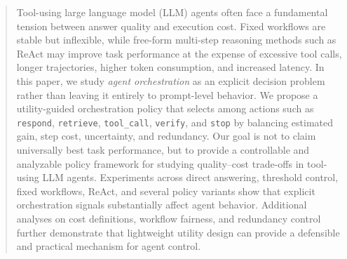 \begin{abstract}
Tool-using large language model (LLM) agents often face a fundamental tension between answer quality and execution cost. Fixed workflows are stable but inflexible, while free-form multi-step reasoning methods such as ReAct may improve task performance at the expense of excessive tool calls, longer trajectories, higher token consumption, and increased latency. In this paper, we study \emph{agent orchestration} as an explicit decision problem rather than leaving it entirely to prompt-level behavior. We propose a utility-guided orchestration policy that selects among actions such as \texttt{respond}, \texttt{retrieve}, \texttt{tool\_call}, \texttt{verify}, and \texttt{stop} by balancing estimated gain, step cost, uncertainty, and redundancy. Our goal is not to claim universally best task performance, but to provide a controllable and analyzable policy framework for studying quality--cost trade-offs in tool-using LLM agents. Experiments across direct answering, threshold control, fixed workflows, ReAct, and several policy variants show that explicit orchestration signals substantially affect agent behavior. Additional analyses on cost definitions, workflow fairness, and redundancy control further demonstrate that lightweight utility design can provide a defensible and practical mechanism for agent control.
\end{abstract}
